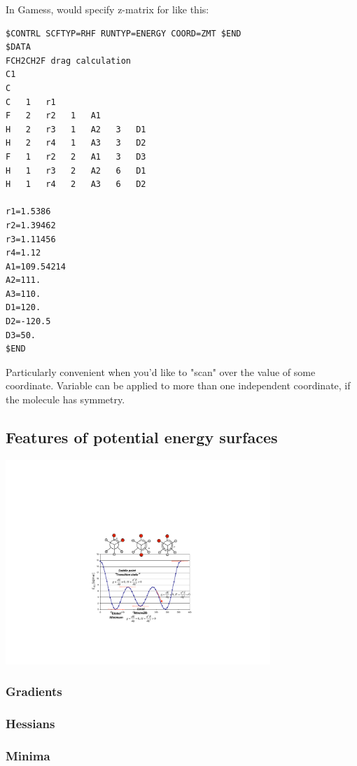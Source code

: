 \documentclass[11pt]{article}
\begin{document}
In Gamess, would specify z-matrix for  like this:
\begin{verbatim}
$CONTRL SCFTYP=RHF RUNTYP=ENERGY COORD=ZMT $END
$DATA
FCH2CH2F drag calculation
C1
C
C   1   r1
F   2   r2   1   A1
H   2   r3   1   A2   3   D1
H   2   r4   1   A3   3   D2
F   1   r2   2   A1   3   D3
H   1   r3   2   A2   6   D1
H   1   r4   2   A3   6   D2

r1=1.5386
r2=1.39462
r3=1.11456
r4=1.12
A1=109.54214
A2=111.
A3=110.
D1=120.
D2=-120.5
D3=50.
$END
\end{verbatim}
Particularly convenient when you'd like to "scan" over the value of some coordinate.  Variable can be applied to more than one independent coordinate, if the molecule has symmetry.

\subsection{Features of potential energy surfaces}
\label{sec-6-2}
\begin{center}
\includegraphics[width=0.75\textwidth]{./Images/PES.pdf}
\end{center}

\subsubsection{Gradients}
\label{sec-6-2-1}

\subsubsection{Hessians}
\label{sec-6-2-2}

\subsubsection{Minima}
\label{sec-6-2-3}
\end{document}
